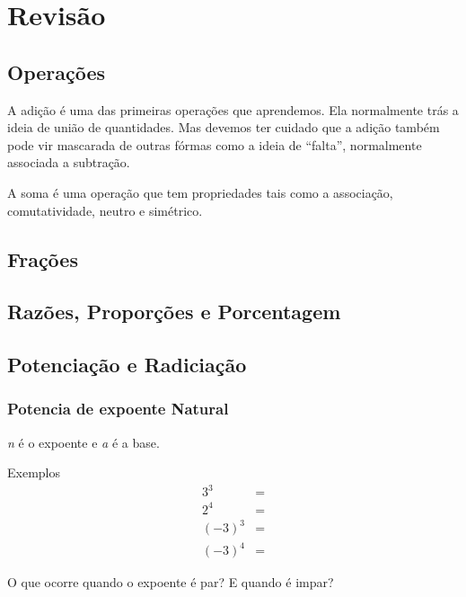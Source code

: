 \chapter{Revisão}
\section{Operações}
A adição é uma das primeiras operações que aprendemos. Ela normalmente trás a ideia de união de quantidades. Mas devemos ter cuidado que a adição também pode vir mascarada de outras fórmas como a ideia de ``falta'', normalmente associada a subtração.

A soma é uma operação que tem propriedades tais como a associação, comutatividade, neutro e simétrico.

\section{Frações}

\section{Razões, Proporções e Porcentagem}

\section{Potenciação e Radiciação}

\subsection{Potencia de expoente Natural}
\begin{center}
\end{center}

\textit{n} é o expoente e \textit{a} é a base.

Exemplos
\begin{align*}
3^3&=\\
2^4&=\\
(-3)^3&=\\
(-3)^4&=
\end{align*}

O que ocorre quando o expoente é par? E quando é impar?
\begin{center}


\end{center}

